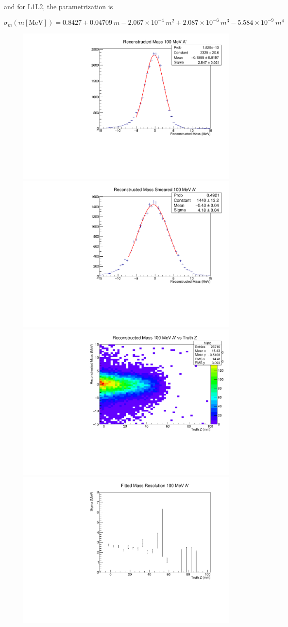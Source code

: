and for L1L2, the parametrization is

\begin{equation}
    \sigma_m(m\mathrm{[MeV]}) = 0.8427 + 0.04709 \ m -2.067\times 10^{-4} \ m^2 + 2.087\times 10^{-6} \ m^3 - 5.584\times 10^{-9} \ m^4
    \label{eq:mres_L1L2}
\end{equation}


\begin{figure}[!hb]
    \centering
    \includegraphics[width=.45\textwidth]{figs/selection/massResL1L1_ap100MeV.pdf}
    \includegraphics[width=.45\textwidth]{figs/selection/massResL1L1_ap100MeV_smeared.pdf}
    \includegraphics[width=.45\textwidth]{figs/selection/massResL1L1_ap100MeV_m_z.pdf}
    \includegraphics[width=.45\textwidth]{figs/selection/massResL1L1_ap100MeV_z.pdf}

\end{figure}
